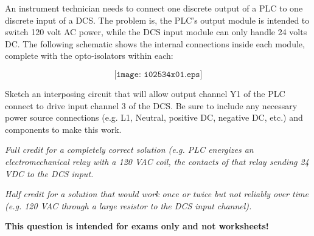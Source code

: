 

An instrument technician needs to connect one discrete output of a PLC to one discrete input of a DCS.  The problem is, the PLC's output module is intended to switch 120 volt AC power, while the DCS input module can only handle 24 volts DC.  The following schematic shows the internal connections inside each module, complete with the opto-isolators within each:

$$\texttt{[image: i02534x01.eps]}$$

\vskip 80pt

Sketch an interposing circuit that will allow output channel Y1 of the PLC connect to drive input channel 3 of the DCS.  Be sure to include any necessary power source connections (e.g. L1, Neutral, positive DC, negative DC, etc.) and components to make this work.







{\it Full credit for a completely correct solution (e.g. PLC energizes an electromechanical relay with a 120 VAC coil, the contacts of that relay sending 24 VDC to the DCS input.}

\vskip 10pt

{\it Half credit for a solution that would work once or twice but not reliably over time (e.g. 120 VAC through a large resistor to the DCS input channel).}







{\bf This question is intended for exams only and not worksheets!}



